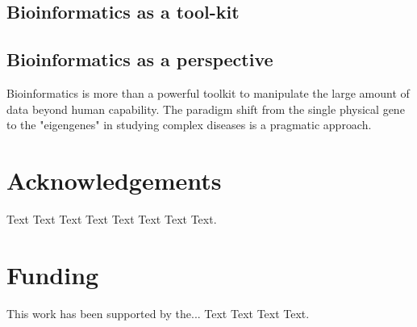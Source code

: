 \documentclass{bioinfo}
\begin{document}
\subsection{Bioinformatics as a tool-kit}
%
%
%
%
\subsection{Bioinformatics as a perspective}

Bioinformatics is more than a powerful toolkit to manipulate the large amount of data beyond human capability. The paradigm shift from the single physical gene to the "eigengenes" in studying complex diseases \cite{Weiss:2012:Good} is a pragmatic approach.


\enlargethispage{12pt}




\section*{Acknowledgements}

Text Text Text Text Text Text  Text Text.  
\vspace*{-12pt}

\section*{Funding}

This work has been supported by the... Text Text  Text Text.\vspace*{-12pt}


%
%
%
%
%
%

\end{document}
